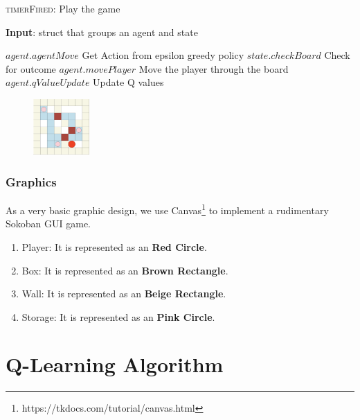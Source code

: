 \documentclass{article}
\begin{document}
\begin{algorithm}
    \caption{\textsc{timerFired}: Play the game}\label{euclid}
    \hspace*{\algorithmicindent} \textbf{Input}: struct that groups an agent and state \\
    \begin{algorithmic}
        \State $agent.agentMove$ Get Action from epsilon greedy policy
        \State $state.checkBoard$ Check for outcome
        \State $agent.movePlayer$ Move the player through the board
        \State $agent.qValueUpdate$ Update Q values
    \EndIf 
    \end{algorithmic}
\end{algorithm}

{
\begin{figure} %
    \centering
    \includegraphics[width=0.19\textwidth]{graphic_board}
\end{figure}

\subsubsection{Graphics}

As a very basic graphic design, we use Canvas\footnote{https://tkdocs.com/tutorial/canvas.html} to implement a rudimentary Sokoban GUI game. 

\begin{enumerate}[label=\alph*)]
    \item Player: It is represented as an \textbf{Red Circle}.
    \item Box: It is represented as an \textbf{Brown Rectangle}.
    \item Wall: It is represented as an \textbf{Beige Rectangle}.
    \item Storage: It is represented as an \textbf{Pink Circle}.
\end{enumerate}
}

\section{Q-Learning Algorithm}
\end{document}
